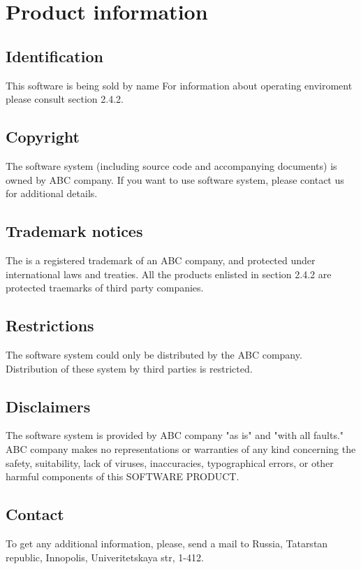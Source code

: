 \chapter{Product information}
\vspace{-6em}


\section{Identification}
This software is being sold by \mysystemname name
For information about operating enviroment please consult section 2.4.2.

\section{Copyright}
The \mysystemname software system (including source code and accompanying
documents) is owned by ABC company. If you want to use \mysystemname software
system, please contact us for additional details.

\section{Trademark notices}
The \mysystemname is a registered trademark of an ABC company, and
protected under international laws and treaties. All the products enlisted in
section 2.4.2 are protected traemarks of third party companies.

\section{Restrictions}
The \mysystemname software system could only be distributed by the ABC company.
Distribution of these system by third parties is restricted.

\section{Disclaimers}
The \mysystemname software system is provided by ABC company "as is" and "with
all faults." ABC company makes no representations or warranties of any kind concerning the safety, suitability, lack of viruses, inaccuracies, typographical errors, or other harmful components of this SOFTWARE PRODUCT.

\section{Contact}
To get any additional information, please, send a mail to Russia, Tatarstan
republic, Innopolis, Univeritetskaya str, 1-412.
